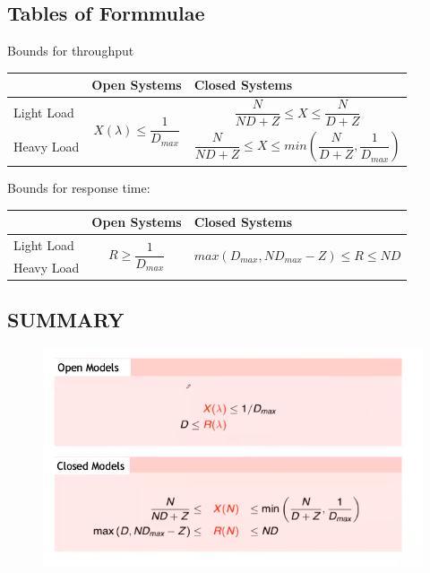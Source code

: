 \documentclass{article}
\begin{document}
			\subsection{Tables of Formmulae}
				Bounds for throughput
				\begin{longtable}{ m{} | m{0.45\textwidth} | m{} |}
					& Open Systems & Closed Systems \\
					\hline
					Light Load & \multirow{2}{0.3\textwidth}{ 
						\begin{equation}
							X(\lambda) \leq \frac{1}{D_{max}}
						\end{equation}
					} &  
						\begin{equation}
							\frac{N}{ND + Z} \leq X \leq \frac{N}{D + Z}
						\end{equation}
					\\
					Heavy Load & & 
						\begin{equation}
							\frac{N}{ND + Z} \leq X \leq min(\frac{N}{D + Z}, \frac{1}{D_{max}})
						\end{equation}
					\\
					\hline					
				\end{longtable}
				Bounds for response time:
				\begin{longtable}{ m{} | m{} | m{} |}
					& Open Systems & Closed Systems \\
					\hline
					Light Load & \multirow{2}{0.3\textwidth}{ 
						\begin{equation}
							R \geq \frac{1}{D_{max}}
						\end{equation}
					} & \multirow{2}{0.3\textwidth}{
						\begin{equation}
							max(D_{max}, ND_{max}-Z) \leq R \leq ND
						\end{equation}
					}
					\\
					Heavy Load & & \\
					\hline					
				\end{longtable}

			\subsection{SUMMARY}	
				\begin{figure}[H]
					\centering
					\includegraphics[width = \textwidth]{./images/superSummary2.png}
				\end{figure}
				
\end{document}
